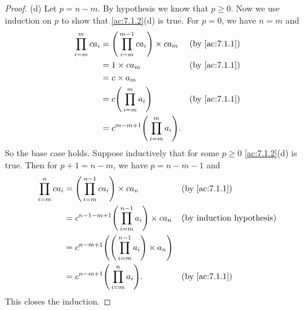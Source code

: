 \begin{proof}{(d)}
  Let \(p = n - m\).
  By hypothesis we know that \(p \geq 0\).
  Now we use induction on \(p\) to show that \cref{ac:7.1.2}(d) is true.
  For \(p = 0\), we have \(n = m\) and
  \begin{align*}
    \prod_{i = m}^m ca_i & = \Bigg(\prod_{i = m}^{m - 1} ca_i\Bigg) \times ca_m &  & \text{(by \cref{ac:7.1.1})} \\
                         & = 1 \times ca_m                                      &  & \text{(by \cref{ac:7.1.1})} \\
                         & = c \times a_m                                                                        \\
                         & = c \Bigg(\prod_{i = m}^m a_i\Bigg)                  &  & \text{(by \cref{ac:7.1.1})} \\
                         & = c^{m - m + 1} \Bigg(\prod_{i = m}^m a_i\Bigg).
  \end{align*}
  So the base case holds.
  Suppose inductively that for some \(p \geq 0\) \cref{ac:7.1.2}(d) is true.
  Then for \(p + 1 = n - m\), we have \(p = n - m - 1\) and
  \begin{align*}
    \prod_{i = m}^n ca_i & = \Bigg(\prod_{i = m}^{n - 1} ca_i\Bigg) \times ca_n                         &  & \text{(by \cref{ac:7.1.1})}      \\
                         & = c^{n - 1 - m + 1} \Bigg(\prod_{i = m}^{n - 1} a_i\Bigg) \times ca_n        &  & \text{(by induction hypothesis)} \\
                         & = c^{n - m + 1} \Bigg(\Bigg(\prod_{i = m}^{n - 1} a_i\Bigg) \times a_n\Bigg)                                       \\
                         & = c^{n - m + 1} \Bigg(\prod_{i = m}^n a_i\Bigg).                             &  & \text{(by \cref{ac:7.1.1})}
  \end{align*}
  This closes the induction.
\end{proof}

